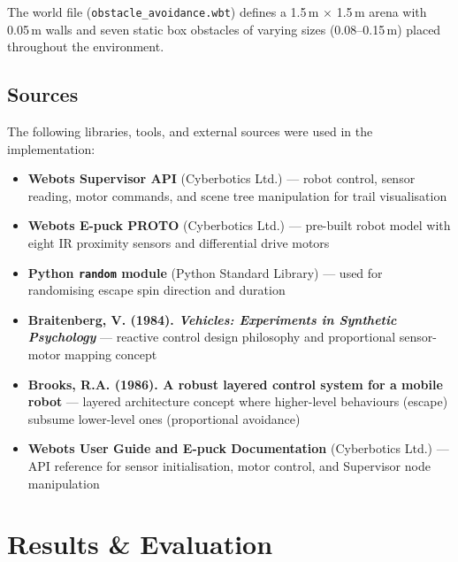 \documentclass[12pt, a4paper]{article}
\begin{document}
The world file (\texttt{obstacle\_avoidance.wbt}) defines a 1.5\,m $\times$ 1.5\,m arena with 0.05\,m walls and seven static box obstacles of varying sizes (0.08--0.15\,m) placed throughout the environment.

\subsection{Sources}

The following libraries, tools, and external sources were used in the implementation:

\begin{itemize}[leftmargin=2em, nosep]
  \item \textbf{Webots Supervisor API} (Cyberbotics Ltd.) --- robot control, sensor reading, motor commands, and scene tree manipulation for trail visualisation
  \item \textbf{Webots E-puck PROTO} (Cyberbotics Ltd.) --- pre-built robot model with eight IR proximity sensors and differential drive motors
  \item \textbf{Python \texttt{random} module} (Python Standard Library) --- used for randomising escape spin direction and duration
  \item \textbf{Braitenberg, V. (1984). \textit{Vehicles: Experiments in Synthetic Psychology}} --- reactive control design philosophy and proportional sensor-motor mapping concept
  \item \textbf{Brooks, R.A. (1986). A robust layered control system for a mobile robot} --- layered architecture concept where higher-level behaviours (escape) subsume lower-level ones (proportional avoidance)
  \item \textbf{Webots User Guide and E-puck Documentation} (Cyberbotics Ltd.) --- API reference for sensor initialisation, motor control, and Supervisor node manipulation
\end{itemize}

\section{Results \& Evaluation}
\end{document}
